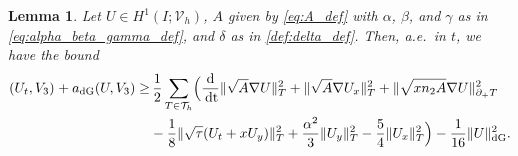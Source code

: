 \documentclass{amsart}
\newcommand{\norm}[2]{\|{#1}\|_{{#2}}}
\newcommand{\dee}{{\rm d}}
\newcommand{\inner}[3]{({#1},{#2})_{{#3}}}
\newcommand{\Th}{\mathcal{T}_h}
\newcommand{\normal}{{n}}
\newcommand{\dt}{\,{\rm dt}}
\newtheorem{lemma}[theorem]{Lemma}
\theoremstyle{definition}
\theoremstyle{remark}
\numberwithin{equation}{section}
\begin{document}
\begin{lemma}\label{lem:semi:hypo}
    Let $U \in H^1(I; {\mathcal{V}}_h)$, $A$ given by \eqref{eq:A_def} with $\alpha$, $\beta$, and $\gamma$ as in \eqref{eq:alpha_beta_gamma_def}, and $\delta$ as in \eqref{def:delta_def}. Then, a.e.~in $t$, we have the bound
    \begin{equation*}\begin{split}
        \inner{U_t}{V_3}{}  +    a_{\rm dG}(U,V_3)
        \geq&\,
        \frac{1}{2}  \sum_{T \in \Th}\! \Big(
       \frac{\dee}{\dt} \norm{\sqrt{A} \nabla U}{T}^2
        +
      \norm{\sqrt{A}\nabla U_x}{T}^2
        +
      \norm{ \sqrt{x\normal_2 A}\nabla U }{\partial_+ T}^2
        \\
        &
        \hspace{0cm}
        -
        \frac{1}{8} \norm{ \sqrt{\tau}(U_t + xU_y) }{T}^2
        +
        \frac{\alpha^2}{3}\norm{U_y}{T}^2
        -
        \frac{5}{4} \norm{U_x}{T}^2
        \Big)
        -
        \frac{1}{16}  \|U\|_{\rm dG}^2.
    \end{split}\end{equation*}
\end{lemma}
\end{document}
